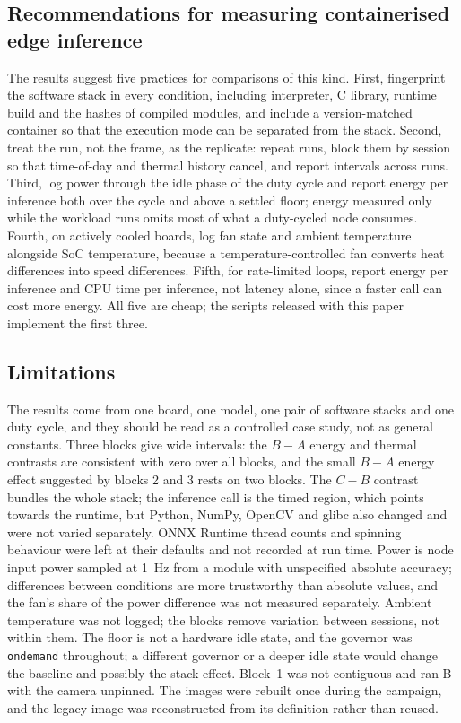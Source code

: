 \documentclass[10pt,journal,compsoc]{IEEEtran}
\begin{document}
\subsection{Recommendations for measuring containerised edge inference}
The results suggest five practices for comparisons of this kind. First, fingerprint the software stack in every condition, including interpreter, C library, runtime build and the hashes of compiled modules, and include a version-matched container so that the execution mode can be separated from the stack. Second, treat the run, not the frame, as the replicate: repeat runs, block them by session so that time-of-day and thermal history cancel, and report intervals across runs. Third, log power through the idle phase of the duty cycle and report energy per inference both over the cycle and above a settled floor; energy measured only while the workload runs omits most of what a duty-cycled node consumes. Fourth, on actively cooled boards, log fan state and ambient temperature alongside SoC temperature, because a temperature-controlled fan converts heat differences into speed differences. Fifth, for rate-limited loops, report energy per inference and CPU time per inference, not latency alone, since a faster call can cost more energy. All five are cheap; the scripts released with this paper implement the first three.

\subsection{Limitations}
The results come from one board, one model, one pair of software stacks and one duty cycle, and they should be read as a controlled case study, not as general constants. Three blocks give wide intervals: the $B-A$ energy and thermal contrasts are consistent with zero over all blocks, and the small $B-A$ energy effect suggested by blocks 2 and 3 rests on two blocks. The $C-B$ contrast bundles the whole stack; the inference call is the timed region, which points towards the runtime, but Python, NumPy, OpenCV and glibc also changed and were not varied separately. ONNX Runtime thread counts and spinning behaviour were left at their defaults and not recorded at run time. Power is node input power sampled at 1~Hz from a module with unspecified absolute accuracy; differences between conditions are more trustworthy than absolute values, and the fan's share of the power difference was not measured separately. Ambient temperature was not logged; the blocks remove variation between sessions, not within them. The floor is not a hardware idle state, and the governor was \texttt{ondemand} throughout; a different governor or a deeper idle state would change the baseline and possibly the stack effect. Block~1 was not contiguous and ran B with the camera unpinned. The images were rebuilt once during the campaign, and the legacy image was reconstructed from its definition rather than reused.
\end{document}
